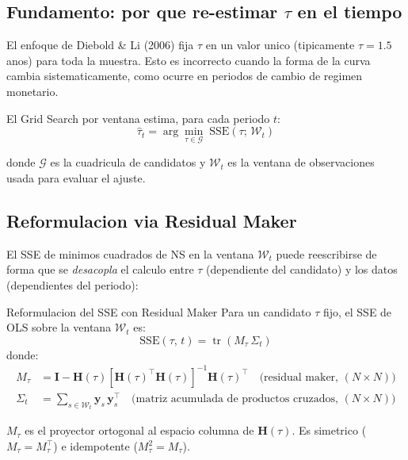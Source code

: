 \documentclass[12pt, a4paper]{article}
\theoremstyle{plain}
\theoremstyle{definition}
\theoremstyle{remark}
\newcommand{\by}{\mathbf{y}}
\newcommand{\bH}{\mathbf{H}}
\newcommand{\bI}{\mathbf{I}}
\newcommand{\tr}{\operatorname{tr}}
\begin{document}
\subsection{Fundamento: por que re-estimar $\tau$ en el tiempo}

El enfoque de Diebold \& Li (2006) fija $\tau$ en un valor unico
(tipicamente $\tau = 1.5$ anos) para toda la muestra.
Esto es incorrecto cuando la forma de la curva cambia sistematicamente,
como ocurre en periodos de cambio de regimen monetario.

El Grid Search por ventana estima, para cada periodo $t$:
\begin{equation}
  \hat{\tau}_t = \arg\min_{\tau \in \mathcal{G}}\;
    \text{SSE}(\tau;\, \mathcal{W}_t)
  \label{eq:gridsearch}
\end{equation}

donde $\mathcal{G}$ es la cuadricula de candidatos y
$\mathcal{W}_t$ es la ventana de observaciones usada para evaluar el ajuste.

\subsection{Reformulacion via Residual Maker}

El SSE de minimos cuadrados de NS en la ventana $\mathcal{W}_t$ puede
reescribirse de forma que se \emph{desacopla} el calculo entre $\tau$
(dependiente del candidato) y los datos (dependientes del periodo):

\begin{teoremabox}{Reformulacion del SSE con Residual Maker}
Para un candidato $\tau$ fijo, el SSE de OLS sobre la ventana $\mathcal{W}_t$ es:
\begin{equation}
  \text{SSE}(\tau,\, t) = \tr\!\left(M_\tau\,\Sigma_t\right)
  \label{eq:sse_trace}
\end{equation}
donde:
\begin{align}
  M_\tau &= \bI - \bH(\tau)\!\left[\bH(\tau)^\top\bH(\tau)\right]^{-1}\!\bH(\tau)^\top
  \quad \text{(residual maker, $(N \times N)$)}
  \label{eq:resmaker} \\
  \Sigma_t &= \sum_{s \in \mathcal{W}_t} \by_s\,\by_s^\top
  \quad \text{(matriz acumulada de productos cruzados, $(N \times N)$)}
  \label{eq:sigma_t}
\end{align}
\end{teoremabox}

$M_\tau$ es el proyector ortogonal al espacio columna de $\bH(\tau)$.
Es simetrico ($M_\tau = M_\tau^\top$) e idempotente ($M_\tau^2 = M_\tau$).
\end{document}
